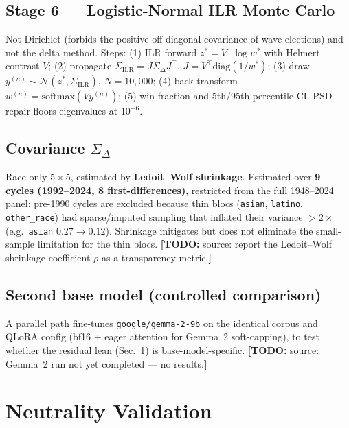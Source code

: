\documentclass[11pt]{article}
\newcommand{\todo}[1]{{\color{red}\textbf{[TODO:} #1\textbf{]}}}
\begin{document}
\subsection{Stage 6 --- Logistic-Normal ILR Monte Carlo}
Not Dirichlet (forbids the positive off-diagonal covariance of wave elections)
and not the delta method. Steps: (1) ILR forward $z^{*}=V^{\top}\log w^{*}$ with
Helmert contrast $V$; (2) propagate $\Sigma_{\text{ILR}}=J\Sigma_\Delta J^{\top}$,
$J=V^{\top}\mathrm{diag}(1/w^{*})$; (3) draw $y^{(n)}\sim\mathcal N(z^{*},
\Sigma_{\text{ILR}})$, $N{=}10{,}000$; (4) back-transform
$w^{(n)}=\mathrm{softmax}(Vy^{(n)})$; (5) win fraction and 5th/95th-percentile
CI. PSD repair floors eigenvalues at $10^{-6}$.

\subsection{Covariance $\Sigma_\Delta$}\label{sec:cov}
Race-only $5\times5$, estimated by \textbf{Ledoit--Wolf shrinkage}.
Estimated over \textbf{9 cycles (1992--2024, 8 first-differences)}, restricted
from the full 1948--2024 panel: pre-1990 cycles are excluded because thin blocs
(\texttt{asian}, \texttt{latino}, \texttt{other\_race}) had sparse/imputed
sampling that inflated their variance $>2\times$ (e.g.\ \texttt{asian}
$0.27\!\rightarrow\!0.12$). Shrinkage mitigates but does not eliminate the
small-sample limitation for the thin blocs.
\todo{source: report the Ledoit--Wolf shrinkage coefficient $\rho$ as a
transparency metric.}

\subsection{Second base model (controlled comparison)}
A parallel path fine-tunes \texttt{google/gemma-2-9b} on the identical corpus and
QLoRA config (bf16 + eager attention for Gemma~2 soft-capping), to test whether
the residual lean (Sec.~\ref{sec:neutrality}) is base-model-specific.
\todo{source: Gemma~2 run not yet completed --- no results.}

\section{Neutrality Validation}\label{sec:neutrality}
\end{document}
